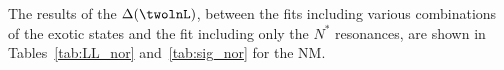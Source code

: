 The results of the $\Delta(\twolnL)$, 
between the fits including various combinations of the exotic states and the fit including only the $N^*$ resonances, 
are shown in Tables~\ref{tab:LL_nor} and~\ref{tab:sig_nor} for the NM. 



